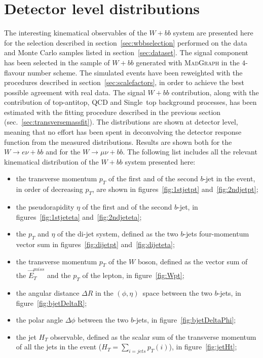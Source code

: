 \section{Detector level distributions}
\label{sec:detectorlevel}

The interesting kinematical observables of the $W + bb$ system are presented here
for the selection described in section~\ref{sec:wbbselection} performed on the
data and Monte Carlo samples listed in section~\ref{sec:dataset}.
The signal component has been selected in the sample of $W + bb$ generated with
\textsc{MadGraph} in the $4$-flavour number scheme.
The simulated events have been reweighted with the procedures
described in section~\ref{sec:scalefactors},
in order to achieve the best possible
agreement with real data.
The signal $W + bb$ contribution, along with the contribution of top-antitop, QCD and
Single~top background processes, has been estimated with the fitting procedure
described in the previous section (sec.~\ref{sec:transversemassfit}).
The distributions are shown at detector level,
meaning that no effort has been spent in
deconvolving the detector response function from the measured distributions.
Results are shown both for the $W \rightarrow e \nu + bb$ and for the
$W \rightarrow \mu \nu + bb$.
The following list includes all the relevant kinematical distribution of
the $W + bb$ system presented here:
\begin{itemize}
  \item the transverse momentum $p_{T}$ of the first and of the second $b$-jet
    in the event, in order of decreasing $p_{T}$, are shown in
    figures~\ref{fig:1stjetpt} and~\ref{fig:2ndjetpt};
  \item the pseudorapidity $\eta$ of the first and of the second $b$-jet,
    in figures~\ref{fig:1stjeteta} and~\ref{fig:2ndjeteta};
  \item the $p_{T}$ and $\eta$ of the di-jet system, defined as the
     two $b$-jets four-momentum vector sum in figures~\ref{fig:dijetpt} and~\ref{fig:dijeteta};
  \item the transverse momentum $p_{T}$ of the $W$ boson, defined as the
    vector sum of the $\vec{E}_{T}^{miss}$ and the $p_{T}$ of the lepton,
    in figure~\ref{fig:Wpt};
  \item the angular distance $\Delta R$ in the $(\phi,\eta)$~space between the two
    $b$-jets, in figure~\ref{fig:bjetDeltaR};
  \item the polar angle $\Delta \phi$ between the two
    $b$-jets, in figure~\ref{fig:bjetDeltaPhi};
  \item the jet $H_{T}$ observable, defined as the scalar sum of the
    transverse momentum of all the jets in the event ($H_{T} = \sum_{i = jets} p_{T}(i)$),
    in figure~\ref{fig:jetHt};
\end{itemize}

